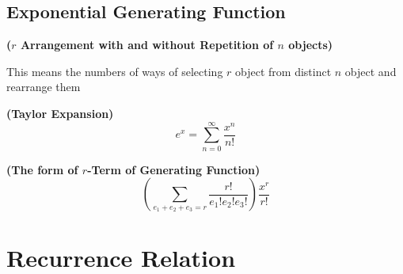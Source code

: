 \documentclass{report}
\begin{document}
\section{Exponential Generating Function}
\begin{theorem}
\textbf{($r$ Arrangement with and without Repetition of $n$ objects)}
\begin{center}
   \begin{minipage}{0.9\linewidth}  
       \centering
       This means the numbers of ways of selecting $r$ object from distinct $n$ object and rearrange them  
   \end{minipage}
\end{center}
\end{theorem}
\begin{theorem}
\textbf{(Taylor Expansion)}
\begin{equation*}
e^x=\sum_{n=0}^\infty \frac{x^n}{n!}
\end{equation*}
\end{theorem}
\begin{theorem}
\textbf{(The form of $r$-Term of Generating Function)}
\begin{equation*}
  (\sum_{e_1+e_2+e_3=r} \frac{r!}{e_1!e_2!e_3!}) \frac{x^r}{r!}
\end{equation*}
\end{theorem}
\chapter{Recurrence Relation}
\end{document}
